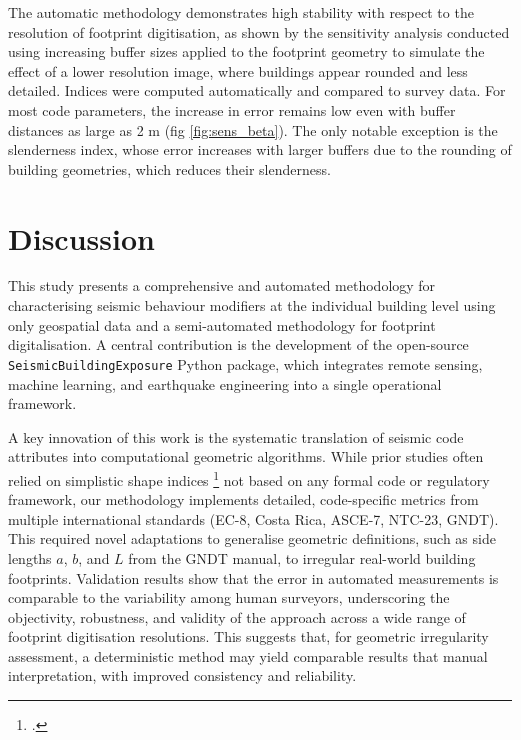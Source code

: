 \begin{refsection}
The automatic methodology demonstrates high stability with respect to the resolution of footprint digitisation, as shown by the sensitivity analysis conducted using increasing buffer sizes applied to the footprint geometry to simulate the effect of a lower resolution image, where buildings appear rounded and less detailed. Indices were computed automatically and compared to survey data. For most code parameters, the increase in error remains low even with buffer distances as large as 2 m (fig \ref{fig:sens_beta}). The only notable exception is the slenderness index, whose error increases with larger buffers due to the rounding of building geometries, which reduces their slenderness.

\FloatBarrier


\renewcommand{\sectionnametext}{Discussion}
\renewcommand{\headingtextR}{\thesection. \sectionnametext}
\section{\sectionnametext}

This study presents a comprehensive and automated methodology for characterising seismic behaviour modifiers at the individual building level using only geospatial data and a semi-automated methodology for footprint digitalisation. A central contribution is the development of the open-source \texttt{SeismicBuildingExposure} Python package, which integrates remote sensing, machine learning, and earthquake engineering into a single operational framework.

A key innovation of this work is the systematic translation of seismic code attributes into computational geometric algorithms. While prior studies often relied on simplistic shape indices \footcite{polsby_third_1991} not based on any formal code or regulatory framework, our methodology implements detailed, code-specific metrics from multiple international standards (EC-8, Costa Rica, ASCE-7, NTC-23, GNDT). This required novel adaptations to generalise geometric definitions, such as side lengths $a$, $b$, and $L$ from the GNDT manual, to irregular real-world building footprints. Validation results show that the error in automated measurements is comparable to the variability among human surveyors, underscoring the objectivity, robustness, and validity of the approach across a wide range of footprint digitisation resolutions. This suggests that, for geometric irregularity assessment, a deterministic method may yield comparable results that manual interpretation, with improved consistency and reliability.


\end{refsection}
